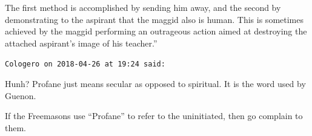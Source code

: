 \begin{footnotesize}
\begin{sffamily}
The first method is accomplished by sending him away, and the second by demonstrating to the aspirant that the maggid also is human. This is sometimes achieved by the maggid performing an outrageous action aimed at destroying the attached aspirant's image of his teacher.''

\hfill

\texttt{Cologero on 2018-04-26 at 19:24 said:}

Hunh? Profane just means secular as opposed to spiritual. It is the word used by Guenon.

If the Freemasons use ``Profane'' to refer to the uninitiated, then go complain to them.

\end{sffamily}
\end{footnotesize}

